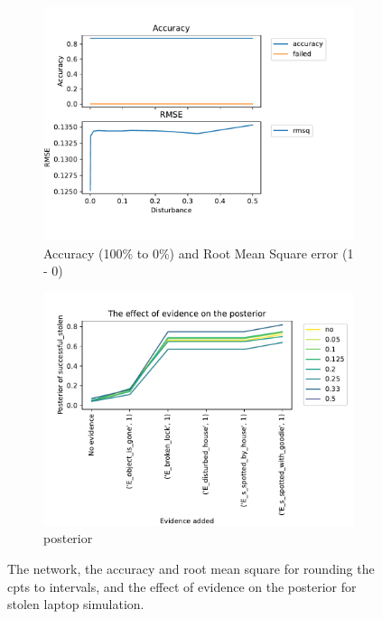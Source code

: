 \begin{figure}[h]
\begin{subfigure}{.45\textwidth}
\includegraphics[width=\linewidth]{../experiments/StolenLaptopPrivate/plots/performance_StolenLaptopPrivate.pdf}
\caption{Accuracy (100\% to 0\%) and Root Mean Square error (1 - 0) }
\label{privatelaptopAcc}
\end{subfigure}

\begin{subfigure}{.45\textwidth}
\includegraphics[width=\linewidth]{../experiments/StolenLaptopPrivate/plots/posterior_StolenLaptopPrivate.pdf}
\caption{posterior }
\label{privatelaptoppost}
\end{subfigure}

\caption{The network, the accuracy and root mean square for rounding the cpts to intervals, and the effect of evidence on the posterior for stolen laptop simulation.}
\label{private}

\end{figure}


